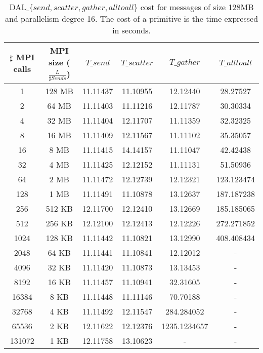 \begin{table}[h]
\begin{center}
\begin{tabular}{|c|c|c|c|c|c|}\hline
\hline
$\sharp$ MPI calls & MPI size ($\frac{L}{\sharp Sends}$)  & $T\_send$   & $T\_scatter$  & $T\_gather$ & $T\_alltoall$      \\\hline\hline
1 & 128 MB & 11.11437 & 11.10955 & 12.12440 & 28.27527 \\\hline
2 & 64 MB & 11.11403 & 11.11216 & 12.11787 & 30.30334 \\\hline
4 & 32 MB & 11.11404 & 12.11707 & 11.11359 & 32.32325 \\\hline
8 & 16 MB & 11.11409 & 12.11567 & 11.11102 & 35.35057 \\\hline
16 & 8 MB & 11.11415 & 14.14157 & 11.11047 & 42.42438 \\\hline
32 & 4 MB & 11.11425 & 12.12152 & 11.11131 & 51.50936 \\\hline
64 & 2 MB & 11.11472 & 12.12739 & 12.12321 & 123.123474 \\\hline
128 & 1 MB & 11.11491 & 11.10878 & 13.12637 & 187.187238 \\\hline
256 & 512 KB & 12.11700 & 12.12410 & 13.12669 & 185.185065 \\\hline
512 & 256 KB & 12.12100 & 12.12413 & 12.12226 & 272.271852 \\\hline
1024 & 128 KB & 11.11442 & 11.10821 & 13.12990 & 408.408434 \\\hline
2048 & 64 KB & 11.11441 & 11.10841 & 12.12012 & - \\\hline
4096 & 32 KB & 11.11420 & 11.10873 & 13.13453 & - \\\hline
8192 & 16 KB & 11.11457 & 11.10941 & 32.31605 & - \\\hline
16384 & 8 KB & 11.11448 & 11.11146 & 70.70188 & - \\\hline
32768 & 4 KB & 11.11492 & 12.11547 & 284.284052 & - \\\hline
65536 & 2 KB & 12.11622 & 12.12376 & 1235.1234657 & - \\\hline
131072 & 1 KB & 12.11758 & 13.10623 & - & - \\\hline
\end{tabular}
\caption{DAL$\_\lbrace send, scatter, gather, alltoall \rbrace$ cost for messages of size 128MB and parallelism degree 16. The cost of a primitive is the time expressed in seconds.}
\label{tsetup-pianosa-n16-M128}
\end{center}
\end{table}

